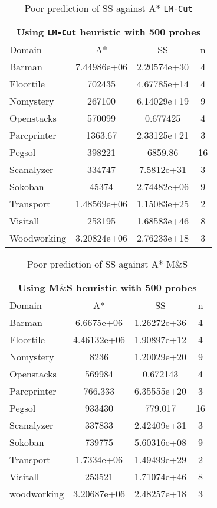 \begin{table}[]
\centering
\caption{Poor prediction of SS against A* \texttt{LM-Cut}}
\label{tb:pred_ss_a_lmcut}
\begin{tabular}{lccc}
\hline
\multicolumn{4}{c}{Using \texttt{LM-Cut} heuristic with 500 probes} \\ \hline
Domain& A*& SS& n \\ \hline

Barman& 7.44986e+06& 2.20574e+30& 4\\
Floortile& 702435& 4.67785e+14& 4\\
Nomystery& 267100& 6.14029e+19& 9\\
Openstacks& 570099& 0.677425& 4\\
Parcprinter& 1363.67& 2.33125e+21& 3\\
Pegsol& 398221& 6859.86& 16\\
Scanalyzer& 334747& 7.5812e+31& 3\\
Sokoban& 45374& 2.74482e+06& 9\\
Transport& 1.48569e+06& 1.15083e+25& 2\\
Visitall& 253195& 1.68583e+46& 8\\
Woodworking& 3.20824e+06& 2.76233e+18& 3\\ \hline
\end{tabular}
\end{table}



\begin{table}[]
\centering
\caption{Poor prediction of SS against A* M$\&$S}
\label{tb:pred_ss_a_mand}
\begin{tabular}{lccc}
\hline
\multicolumn{4}{c}{Using M$\&$S heuristic with 500 probes} \\ \hline
Domain& A*& SS& n \\ \hline

Barman& 6.6675e+06& 1.26272e+36& 4\\
Floortile& 4.46132e+06& 1.90897e+12& 4\\
Nomystery& 8236& 1.20029e+20& 9\\
Openstacks& 569984& 0.672143& 4\\
Parcprinter& 766.333& 6.35555e+20& 3\\
Pegsol& 933430& 779.017& 16\\
Scanalyzer& 337833& 2.42409e+31& 3\\
Sokoban& 739775& 5.60316e+08& 9\\
Transport& 1.7334e+06& 1.49499e+29& 2\\
Visitall& 253521& 1.71074e+46& 8\\
woodworking& 3.20687e+06& 2.48257e+18& 3\\ \hline
\end{tabular}
\end{table}




\clearpage
